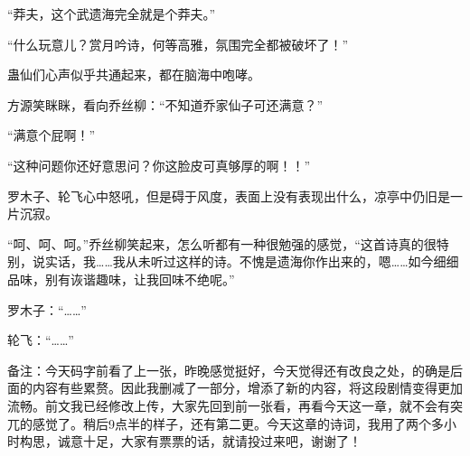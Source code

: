 \begin{this_body}
“莽夫，这个武遗海完全就是个莽夫。”

“什么玩意儿？赏月吟诗，何等高雅，氛围完全都被破坏了！”

蛊仙们心声似乎共通起来，都在脑海中咆哮。

方源笑眯眯，看向乔丝柳：“不知道乔家仙子可还满意？”

“满意个屁啊！”

“这种问题你还好意思问？你这脸皮可真够厚的啊！！”

罗木子、轮飞心中怒吼，但是碍于风度，表面上没有表现出什么，凉亭中仍旧是一片沉寂。

“呵、呵、呵。”乔丝柳笑起来，怎么听都有一种很勉强的感觉，“这首诗真的很特别，说实话，我……我从未听过这样的诗。不愧是遗海你作出来的，嗯……如今细细品味，别有诙谐趣味，让我回味不绝呢。”

罗木子：“……”

轮飞：“……”

备注：今天码字前看了上一张，昨晚感觉挺好，今天觉得还有改良之处，的确是后面的内容有些累赘。因此我删减了一部分，增添了新的内容，将这段剧情变得更加流畅。前文我已经修改上传，大家先回到前一张看，再看今天这一章，就不会有突兀的感觉了。稍后9点半的样子，还有第二更。今天这章的诗词，我用了两个多小时构思，诚意十足，大家有票票的话，就请投过来吧，谢谢了！

\end{this_body}

